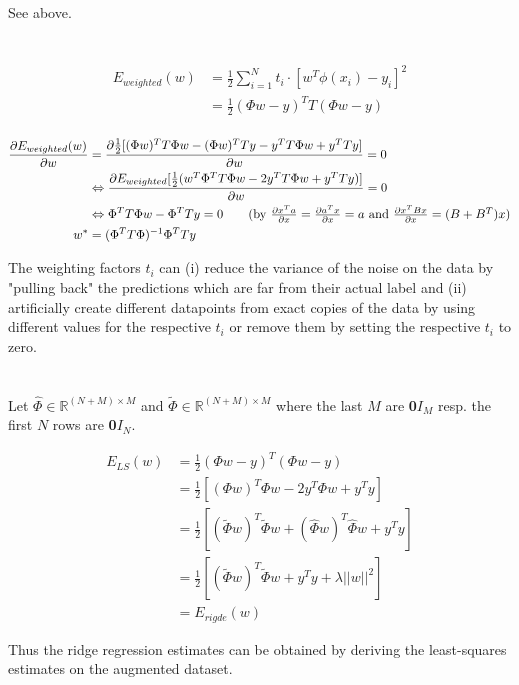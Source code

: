 \documentclass[11pt]{article}
\newcommand{\exercise}{\section{}}
\newcommand{\sumf}[3]{\sum_{#1}^{#2} #3}
\newcommand{\partialf}[2]{\frac{\partial #1}{\partial #2}}
\newcommand{\R}{\mathbb{R}}
\begin{document}
\exercise

See above.

\exercise

\begin{align*}
E_{weighted}(w) &= \frac{1}{2} \sumf{i=1}{N}{t_i \cdot [w^T \phi(x_i) - y_i]^2} \\
&= \frac{1}{2}(\Phi w - y)^T T (\Phi w - y) \tag{T = diag($t_i$), i = [1,...,N]} \\
\end{align*}

\begin{align*}
\partialf{E_{weighted}(w)}{w} &= \partialf{\frac{1}{2}[ (\Phi w)^T T  \Phi w - (\Phi w)^T T y - y^T T \Phi w + y^T T y]}{w} = 0 \\
&\Leftrightarrow \partialf{E_{weighted}[ \frac{1}{2} ( w^T \Phi^T  T  \Phi w  - 2 y^T T \Phi w + y^T T y)]}{w} = 0 \\
&\Leftrightarrow \Phi^T T \Phi w - \Phi^T T y = 0 \tag{by $\partialf{x^T a}{x} =  \partialf{a^T x}{x} = a$ and $\partialf{x^TBx}{x} = (B+ B^T)x$} \\
w^* &= (\Phi^T T \Phi)^{-1} \Phi^T T y
\end{align*}

The weighting factors $t_i$ can (i) reduce the variance of the noise on the data by "pulling back" the predictions which are far from their actual label and (ii) artificially create different datapoints from exact copies of the data by using different values for the respective $t_i$ or remove them by setting the respective $t_i$ to zero.

\exercise

Let $\hat{\Phi} \in \R^{(N + M) \times M}$ and $\tilde{\Phi} \in \R^{(N + M) \times M}$ where the last $M$ are \textbf{0}$I_M$ resp. the first $N$ rows are \textbf{0}$I_N$.

\begin{align*}
E_{LS}(w) &= \frac{1}{2} (\Phi w - y)^T (\Phi w - y) \\
&= \frac{1}{2}[ (\Phi w)^T \Phi w  - 2 y^T \Phi w + y^T y] \\
&= \frac{1}{2} [ (\tilde{\Phi} w)^T \tilde{\Phi} w + (\hat{\Phi} w)^T \hat{\Phi} w + y^T y] \\
&= \frac{1}{2} [ (\tilde{\Phi} w)^T \tilde{\Phi} w + y^T y + \lambda ||w||^2] \\
&= E_{rigde}(w)
\end{align*}

Thus the ridge regression estimates can be obtained by deriving the least-squares estimates on the augmented dataset.
\end{document}
